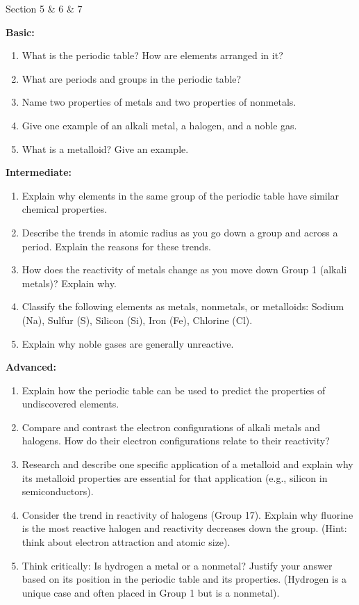 \begin{tieredquestions}{Section 5 & 6 & 7}

\textbf{Basic:}
\begin{enumerate}
    \item What is the periodic table? How are elements arranged in it?
    \item What are periods and groups in the periodic table?
    \item Name two properties of metals and two properties of nonmetals.
    \item Give one example of an alkali metal, a halogen, and a noble gas.
    \item What is a metalloid? Give an example.
\end{enumerate}

\textbf{Intermediate:}
\begin{enumerate}
    \item Explain why elements in the same group of the periodic table have similar chemical properties.
    \item Describe the trends in atomic radius as you go down a group and across a period. Explain the reasons for these trends.
    \item How does the reactivity of metals change as you move down Group 1 (alkali metals)? Explain why.
    \item Classify the following elements as metals, nonmetals, or metalloids: Sodium (Na), Sulfur (S), Silicon (Si), Iron (Fe), Chlorine (Cl).
    \item Explain why noble gases are generally unreactive.
\end{enumerate}

\textbf{Advanced:}
\begin{enumerate}
    \item  Explain how the periodic table can be used to predict the properties of undiscovered elements.
    \item  Compare and contrast the electron configurations of alkali metals and halogens. How do their electron configurations relate to their reactivity?
    \item  Research and describe one specific application of a metalloid and explain why its metalloid properties are essential for that application (e.g., silicon in semiconductors).
    \item  Consider the trend in reactivity of halogens (Group 17). Explain why fluorine is the most reactive halogen and reactivity decreases down the group. (Hint: think about electron attraction and atomic size).
    \item  Think critically: Is hydrogen a metal or a nonmetal? Justify your answer based on its position in the periodic table and its properties. (Hydrogen is a unique case and often placed in Group 1 but is a nonmetal).
\end{enumerate}

\end{tieredquestions}

